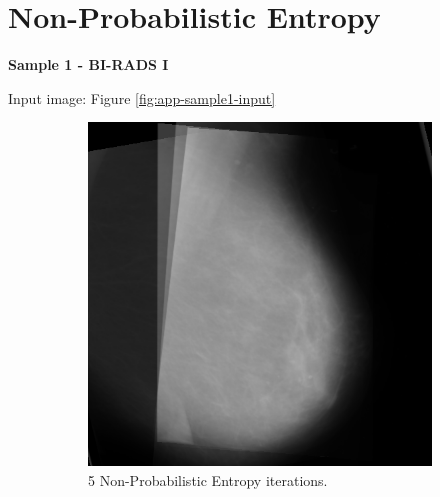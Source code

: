\newpage
\section{Non-Probabilistic Entropy}

\noindent \textbf{Sample 1 - BI-RADS I}

Input image: Figure \ref{fig:app-sample1-input}

\begin{figure}[H]
    \centering
    \begin{subfigure}[t]{0.3\textwidth}
        \includegraphics[width=\textwidth]{Appendix5/sample1/nonProb/nonProb-5.png}
        \caption{5 Non-Probabilistic Entropy iterations.}
        \label{fig:app-5-nonProb-sample1}
    \end{subfigure} \hfill
    ~ %
    \begin{subfigure}[t]{0.3\textwidth}

\end{subfigure}
\end{figure}
